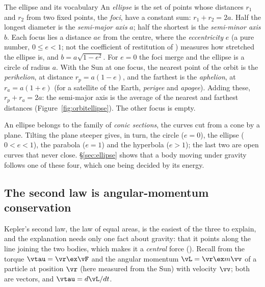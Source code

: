 \begin{defbox}{The ellipse and its vocabulary}
An \emph{ellipse} is the set of points whose distances $r_1$ and $r_2$ from two fixed points, the
\emph{foci}, have a constant sum: $r_1+r_2=2a$. Half the longest diameter is the \emph{semi-major axis}
$a$; half the shortest is the \emph{semi-minor axis} $b$. Each focus lies a distance $ae$ from the centre,
where the \emph{eccentricity} $e$ (a pure number, $0\le e<1$; not the coefficient of restitution of
) measures how stretched the ellipse is, and
$b=a\sqrt{1-e^2}$. For $e=0$ the foci merge and the ellipse is a circle of radius $a$. With the Sun at one
focus, the nearest point of the orbit is the \emph{perihelion}, at distance $r_p=a(1-e)$, and the farthest
is the \emph{aphelion}, at $r_a=a(1+e)$ (for a satellite of the Earth, \emph{perigee} and
\emph{apogee}). Adding these, $r_p+r_a=2a$: the semi-major axis is the average of the nearest and
farthest distances (Figure~\ref{fig:orbitellipse}). The other focus is empty.
\end{defbox}

\begin{figure}[htbp]
\centering
{}
\end{figure}

An ellipse belongs to the family of \emph{conic sections}, the curves cut from a cone by a plane. Tilting
the plane steeper gives, in turn, the circle ($e=0$), the ellipse ($0<e<1$), the parabola ($e=1$) and the
hyperbola ($e>1$); the last two are open curves that never close. \S\ref{sec:ellipse} shows that a body
moving under gravity follows one of these four, which one being decided by its energy.

\subsection{The second law is angular-momentum conservation}

Kepler's second law, the law of equal areas, is the easiest of the three to explain, and the explanation needs
only one fact about gravity: that it points along the line joining the two bodies, which makes it a
\emph{central} force (). Recall from  the torque
$\vtau=\vr\ex\vF$ and the angular momentum $\vL=\vr\ex m\vv$ of a particle at position $\vr$ (here
measured from the Sun) with velocity $\vv$; both are vectors, and $\vtau=d\vL/dt$.

